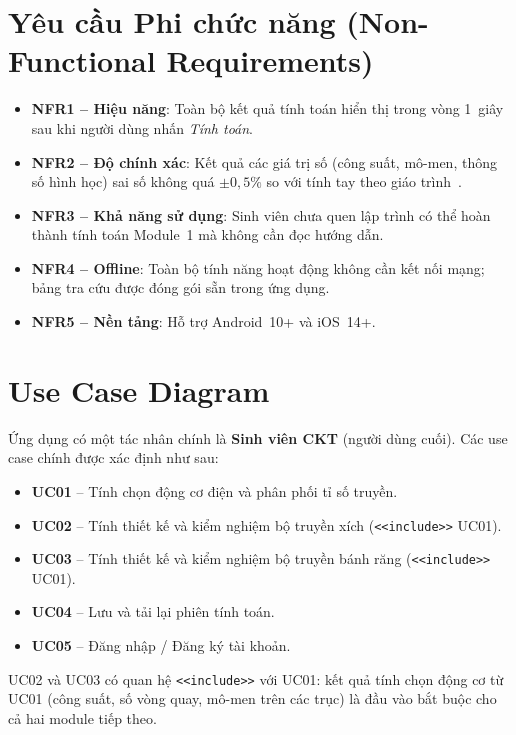 \section{Yêu cầu Phi chức năng (Non-Functional Requirements)}
\label{sec:req-nonfunctional}

\begin{itemize}
  \item \textbf{NFR1 -- Hiệu năng}: Toàn bộ kết quả tính toán hiển thị trong vòng
        1~giây sau khi người dùng nhấn \textit{Tính toán}.
  \item \textbf{NFR2 -- Độ chính xác}: Kết quả các giá trị số (công suất, mô-men,
        thông số hình học) sai số không quá $\pm 0{,}5\%$ so với tính tay
        theo giáo trình~\cite{trinh2006tinh}.
  \item \textbf{NFR3 -- Khả năng sử dụng}: Sinh viên chưa quen lập trình có thể
        hoàn thành tính toán Module~1 mà không cần đọc hướng dẫn.
  \item \textbf{NFR4 -- Offline}: Toàn bộ tính năng hoạt động không cần kết nối mạng;
        bảng tra cứu được đóng gói sẵn trong ứng dụng.
  \item \textbf{NFR5 -- Nền tảng}: Hỗ trợ Android~10+ và iOS~14+.
\end{itemize}
\section{Use Case Diagram}
\label{sec:req-usecase}

Ứng dụng có một tác nhân chính là \textbf{Sinh viên CKT} (người dùng cuối).
Các use case chính được xác định như sau:

\begin{itemize}
  \item \textbf{UC01} -- Tính chọn động cơ điện và phân phối tỉ số truyền.
  \item \textbf{UC02} -- Tính thiết kế và kiểm nghiệm bộ truyền xích (\texttt{<<include>>} UC01).
  \item \textbf{UC03} -- Tính thiết kế và kiểm nghiệm bộ truyền bánh răng (\texttt{<<include>>} UC01).
  \item \textbf{UC04} -- Lưu và tải lại phiên tính toán.
  \item \textbf{UC05} -- Đăng nhập / Đăng ký tài khoản.
\end{itemize}

UC02 và UC03 có quan hệ \texttt{<<include>>} với UC01:
kết quả tính chọn động cơ từ UC01 (công suất, số vòng quay, mô-men trên các trục)
là đầu vào bắt buộc cho cả hai module tiếp theo.

